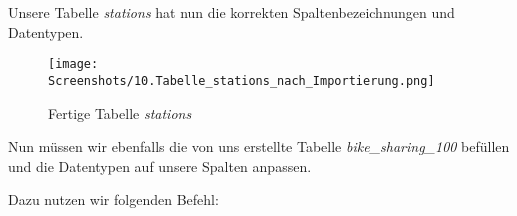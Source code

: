 \documentclass[a4paper, 12pt]{article}
\begin{document}
\newpage
{\fontsize{12}{15}\selectfont
Unsere Tabelle \textit{stations} hat nun die korrekten Spaltenbezeichnungen und Datentypen.

\vspace{\baselineskip}

\begin{figure}[ht]
    \centering
    \texttt{[image: Screenshots/10.Tabelle\_stations\_nach\_Importierung.png]}
    \par  Fertige Tabelle \textit{stations}
\end{figure}

\vspace{\baselineskip}


{\fontsize{12}{15}\selectfont
Nun müssen wir ebenfalls die von uns erstellte Tabelle \textit{bike\_sharing\_100} befüllen und die Datentypen auf unsere Spalten anpassen.

Dazu nutzen wir folgenden Befehl:}

\vspace{\baselineskip}

}
\end{document}
